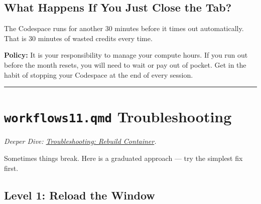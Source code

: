 \documentclass[
  letterpaper,
  DIV=11,
  numbers=noendperiod,
  oneside]{scrreprt}
\begin{document}
\subsection*{What Happens If You Just Close the
Tab?}\label{what-happens-if-you-just-close-the-tab}

The Codespace runs for another 30 minutes before it times out
automatically. That is 30 minutes of wasted credits every time.

\begin{tcolorbox}[enhanced jigsaw, title=\textcolor{quarto-callout-warning-color}{\faExclamationTriangle}\hspace{0.5em}{Warning}, arc=.35mm, toptitle=1mm, colframe=quarto-callout-warning-color-frame, toprule=.15mm, leftrule=.75mm, bottomtitle=1mm, opacityback=0, bottomrule=.15mm, coltitle=black, breakable, opacitybacktitle=0.6, titlerule=0mm, colback=white, left=2mm, colbacktitle=quarto-callout-warning-color!10!white, rightrule=.15mm]

\textbf{Policy:} It is your responsibility to manage your compute hours.
If you run out before the month resets, you will need to wait or pay out
of pocket. Get in the habit of stopping your Codespace at the end of
every session.

\end{tcolorbox}

\begin{center}\rule{0.5\linewidth}{0.5pt}\end{center}

\section*{\texorpdfstring{\texttt{workflows11.qmd}
Troubleshooting}{workflows11.qmd Troubleshooting}}\label{workflows11.qmd-troubleshooting}


\emph{Deeper Dive:
\href{workflows09-troubleshooting.qmd}{Troubleshooting: Rebuild
Container}.}

Sometimes things break. Here is a graduated approach --- try the
simplest fix first.

\subsection*{Level 1: Reload the
Window}\label{level-1-reload-the-window}
\end{document}
